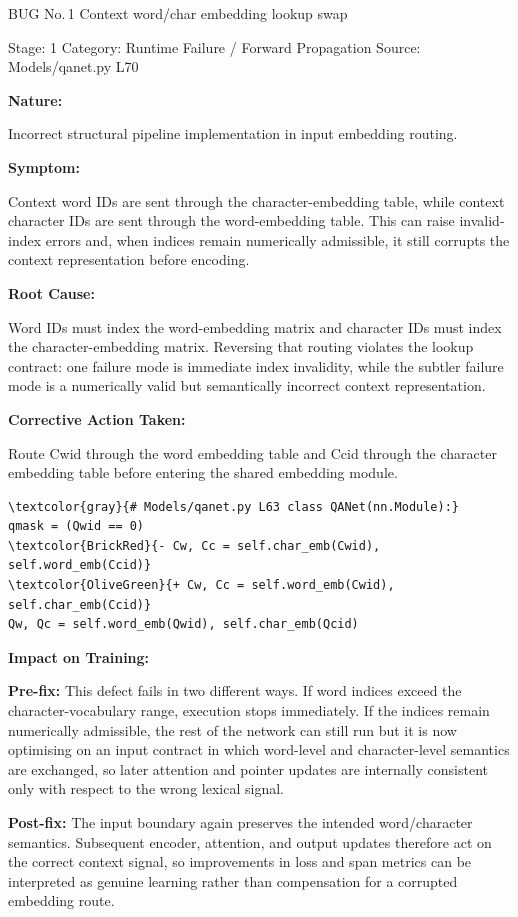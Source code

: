 \documentclass[10pt]{article}
\newcommand{\FieldLabel}[1]{%
 {\bfseries #1:}\par
}
\begin{document}
\begin{bugbox}{BUG No.\,1 \quad Context word/char embedding lookup swap}
{\color{MetaGray}\small Stage: 1 \;\textbar\; Category: Runtime Failure / Forward Propagation \;\textbar\; Source: Models/qanet.py L70\par}
\vspace{0.22em}
\FieldLabel{Nature}
Incorrect structural pipeline implementation in input embedding routing.
\par
\vspace{0.35em}
\FieldLabel{Symptom}
Context word IDs are sent through the character-embedding table, while context character IDs are sent through the word-embedding table. This can raise invalid-index errors and, when indices remain numerically admissible, it still corrupts the context representation before encoding.
\par
\vspace{0.35em}
\FieldLabel{Root Cause}
Word IDs must index the word-embedding matrix and character IDs must index the character-embedding matrix. Reversing that routing violates the lookup contract: one failure mode is immediate index invalidity, while the subtler failure mode is a numerically valid but semantically incorrect context representation.
\par
\vspace{0.35em}
\FieldLabel{Corrective Action Taken}
Route Cwid through the word embedding table and Ccid through the character embedding table before entering the shared embedding module.
\par
\vspace{0.35em}
\begin{Verbatim}[commandchars=\\\{\},fontsize=\footnotesize,breaklines=true,breaksymbol={},frame=leftline,framerule=2pt,rulecolor=\color{gray!40},xleftmargin=6pt,formatcom=\singlespacing]
\textcolor{gray}{# Models/qanet.py L63 class QANet(nn.Module):}
qmask = (Qwid == 0)
\textcolor{BrickRed}{- Cw, Cc = self.char_emb(Cwid), self.word_emb(Ccid)}
\textcolor{OliveGreen}{+ Cw, Cc = self.word_emb(Cwid), self.char_emb(Ccid)}
Qw, Qc = self.word_emb(Qwid), self.char_emb(Qcid)
\end{Verbatim}
\vspace{0.22em}
\FieldLabel{Impact on Training}
\textbf{Pre-fix:} This defect fails in two different ways. If word indices exceed the character-vocabulary range, execution stops immediately. If the indices remain numerically admissible, the rest of the network can still run but it is now optimising on an input contract in which word-level and character-level semantics are exchanged, so later attention and pointer updates are internally consistent only with respect to the wrong lexical signal.\par\smallskip
\textbf{Post-fix:} The input boundary again preserves the intended word/character semantics. Subsequent encoder, attention, and output updates therefore act on the correct context signal, so improvements in loss and span metrics can be interpreted as genuine learning rather than compensation for a corrupted embedding route.
\par
\vspace{0.35em}
\end{bugbox}
\end{document}
